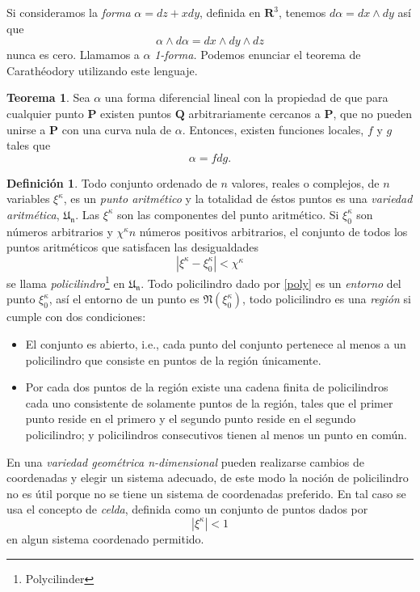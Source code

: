 \documentclass{article}
\theoremstyle{definition} \newtheorem{defi}{Definici\'on}
\theoremstyle{definition} \newtheorem{teo}{Teorema}
\theoremstyle{definition} \newtheorem{cor}{Corolario}
\begin{document}
Si consideramos la \emph{forma} $\alpha=dz+xdy$, definida en $\mathbf{R}^3$, tenemos $d\alpha=dx \wedge dy$ as\'i que $$\alpha \wedge d\alpha = dx \wedge dy \wedge dz$$ nunca es cero. Llamamos a $\alpha$ \emph{1-forma.}
Podemos enunciar el teorema de Carath\'eodory utilizando este lenguaje.
\begin{teo}
Sea $\alpha$ una forma diferencial lineal con la propiedad de que para cualquier punto $\mathbf{P}$ existen puntos $\mathbf{Q}$ arbitrariamente cercanos a $\mathbf{P}$, que no pueden unirse a $\mathbf{P}$ con una curva nula de $\alpha$. Entonces, existen funciones locales, $f$ y $g$ tales que $$\alpha=fdg.$$ 
\end{teo}
\begin{defi}
Todo conjunto ordenado de $n$ valores, reales o complejos, de $n$ variables $\xi^{\kappa}$, es un \emph{punto aritm\'etico} y la totalidad de \'estos puntos es una \emph{variedad aritm\'etica}, $\mathfrak{U_n}$. Las $\xi^{\kappa}$ son las componentes del punto aritm\'etico. Si $\xi_0^{\kappa}$ son n\'umeros arbitrarios y $\chi^{\kappa}$$n$ n\'umeros positivos arbitrarios, el conjunto de todos los puntos aritm\'eticos que satisfacen las desigualdades
\begin{equation}\label{poly}
|\xi^{\kappa} - \xi_0^{\kappa}|<\chi^{\kappa}
\end{equation}
se llama \emph{policilindro}\footnote{Polycilinder} en $\mathfrak{U_n}$. Todo policilindro dado por \eqref{poly} es un \emph{entorno} del punto $\xi^{\kappa}_0$, as\'i el entorno de un punto es $\mathfrak{N}(\xi^{\kappa}_0)$, todo policilindro es una \emph{regi\'on} si cumple con dos condiciones:
\begin{itemize}
\item El conjunto es abierto, i.e., cada punto del conjunto pertenece al menos a un policilindro que consiste en puntos de la regi\'on \'unicamente.
\item Por cada dos puntos de la regi\'on existe una cadena finita de policilindros cada uno consistente de solamente puntos de la regi\'on, tales que el primer punto reside en el primero y el segundo punto reside en el segundo policilindro; y policilindros consecutivos tienen al menos un punto en com\'un.
\end{itemize}
En una \emph{variedad geom\'etrica n-dimensional} pueden realizarse cambios de coordenadas y elegir un sistema adecuado, de este modo la noci\'on de policilindro no es \'util porque no se tiene un sistema de coordenadas preferido. En tal caso se usa el concepto de \emph{celda}, definida como un conjunto de puntos dados por $$|\xi^{\kappa}|<1$$
en algun sistema coordenado permitido.
\end{defi}
\end{document}
